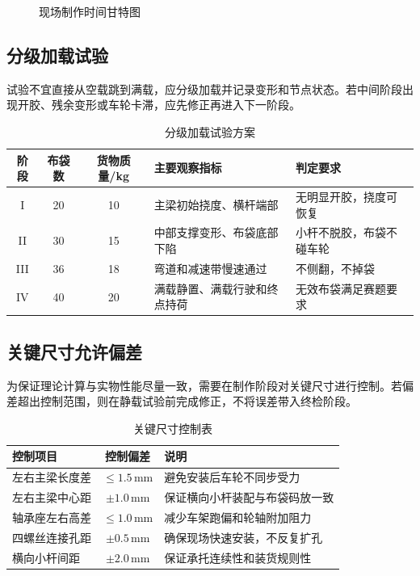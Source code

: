 \documentclass[UTF8,a4paper,12pt,fontset=none]{ctexart}
\numberwithin{equation}{section}
\numberwithin{figure}{section}
\numberwithin{table}{section}
\newcommand{\mm}{\,\mathrm{mm}}
\begin{document}
\begin{figure}[H]
\centering
{}
\caption{现场制作时间甘特图}
\label{fig:gantt}
\end{figure}

\subsection{分级加载试验}
试验不宜直接从空载跳到满载，应分级加载并记录变形和节点状态。若中间阶段出现开胶、残余变形或车轮卡滞，应先修正再进入下一阶段。

\begin{table}[H]
\centering
\caption{分级加载试验方案}
\label{tab:load-test-plan}
\begin{tabularx}{\linewidth}{c c c Y Y}
\toprule
阶段 & 布袋数 & 货物质量/kg & 主要观察指标 & 判定要求 \\
\midrule
I & 20 & 10 & 主梁初始挠度、横杆端部 & 无明显开胶，挠度可恢复 \\
II & 30 & 15 & 中部支撑变形、布袋底部下陷 & 小杆不脱胶，布袋不碰车轮 \\
III & 36 & 18 & 弯道和减速带慢速通过 & 不侧翻，不掉袋 \\
IV & 40 & 20 & 满载静置、满载行驶和终点持荷 & 无效布袋满足赛题要求 \\
\bottomrule
\end{tabularx}
\end{table}

\subsection{关键尺寸允许偏差}
为保证理论计算与实物性能尽量一致，需要在制作阶段对关键尺寸进行控制。若偏差超出控制范围，则在静载试验前完成修正，不将误差带入终检阶段。

\begin{table}[H]
\centering
\caption{关键尺寸控制表}
\label{tab:tolerance}
\begin{tabularx}{\linewidth}{Y c Y}
\toprule
控制项目 & 控制偏差 & 说明 \\
\midrule
左右主梁长度差 & $\le 1.5\mm$ & 避免安装后车轮不同步受力 \\
左右主梁中心距 & $\pm 1.0\mm$ & 保证横向小杆装配与布袋码放一致 \\
轴承座左右高差 & $\le 1.0\mm$ & 减少车架跑偏和轮轴附加阻力 \\
四螺丝连接孔距 & $\pm 0.5\mm$ & 确保现场快速安装，不反复扩孔 \\
横向小杆间距 & $\pm 2.0\mm$ & 保证承托连续性和装货规则性 \\
\bottomrule
\end{tabularx}
\end{table}
\end{document}
